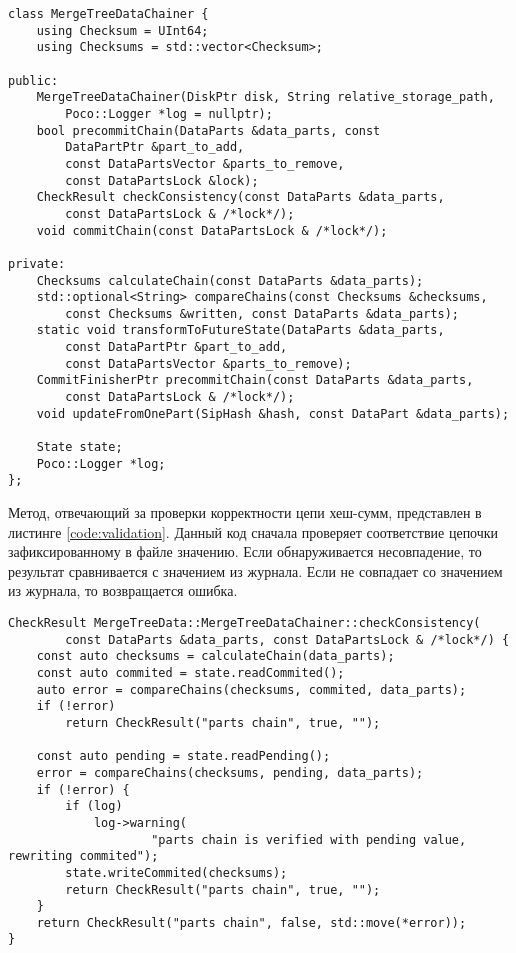 \pagebreak

\begin{lstlisting}[label=code:interface, caption={Класс \texttt{MergeTreeDataChainer}.}]
class MergeTreeDataChainer {
    using Checksum = UInt64;
    using Checksums = std::vector<Checksum>;

public:
    MergeTreeDataChainer(DiskPtr disk, String relative_storage_path,
        Poco::Logger *log = nullptr);
    bool precommitChain(DataParts &data_parts, const
        DataPartPtr &part_to_add,
        const DataPartsVector &parts_to_remove,
        const DataPartsLock &lock);
    CheckResult checkConsistency(const DataParts &data_parts,
        const DataPartsLock & /*lock*/);
    void commitChain(const DataPartsLock & /*lock*/);

private:
    Checksums calculateChain(const DataParts &data_parts);
    std::optional<String> compareChains(const Checksums &checksums,
        const Checksums &written, const DataParts &data_parts);
    static void transformToFutureState(DataParts &data_parts,
        const DataPartPtr &part_to_add,
        const DataPartsVector &parts_to_remove);
    CommitFinisherPtr precommitChain(const DataParts &data_parts,
        const DataPartsLock & /*lock*/);
    void updateFromOnePart(SipHash &hash, const DataPart &data_parts);

    State state;
    Poco::Logger *log;
};
\end{lstlisting}

Метод, отвечающий за проверки корректности цепи хеш-сумм, представлен в листинге \ref{code:validation}. Данный код сначала проверяет соответствие цепочки зафиксированному в файле значению. Если обнаруживается несовпадение, то результат сравнивается с значением из журнала. Если не совпадает со значением из журнала, то возвращается ошибка.

\pagebreak

\begin{lstlisting}[label=code:validation, caption={Валидация цепи хеш-сумм.}]
CheckResult MergeTreeData::MergeTreeDataChainer::checkConsistency(
        const DataParts &data_parts, const DataPartsLock & /*lock*/) {
    const auto checksums = calculateChain(data_parts);
    const auto commited = state.readCommited();
    auto error = compareChains(checksums, commited, data_parts);
    if (!error)
        return CheckResult("parts chain", true, "");

    const auto pending = state.readPending();
    error = compareChains(checksums, pending, data_parts);
    if (!error) {
        if (log)
            log->warning(
                    "parts chain is verified with pending value, rewriting commited");
        state.writeCommited(checksums);
        return CheckResult("parts chain", true, "");
    }
    return CheckResult("parts chain", false, std::move(*error));
}
\end{lstlisting}

